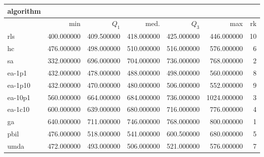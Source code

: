 \begin{tabular}{@{}l*{5}{>{{}}N{4}{0}}>{{}}N{2}{0}@{}}
\toprule
{algorithm} &  \\
\midrule
& {min} & {$Q_1$} & {med.} & {$Q_3$} & {max} & {rk}\\
\midrule
rls & 400.000000 & 409.500000 & 418.000000 & 425.000000 & 446.000000 & 10\\
hc & 476.000000 & 498.000000 & 510.000000 & 516.000000 & 576.000000 & 6\\
sa & 332.000000 & 696.000000 & 704.000000 & 736.000000 & 768.000000 & 2\\
ea-1p1 & 432.000000 & 478.000000 & 488.000000 & 498.000000 & 560.000000 & 8\\
ea-1p10 & 432.000000 & 470.000000 & 480.000000 & 506.000000 & 552.000000 & 9\\
ea-10p1 & 560.000000 & 664.000000 & 684.000000 & 736.000000 & {\color{blue}} 1024.000000 & 3\\
ea-1c10 & 600.000000 & 639.000000 & 680.000000 & 716.000000 & 776.000000 & 4\\
ga & {\color{blue}} 640.000000 & {\color{blue}} 711.000000 & {\color{blue}} 746.000000 & {\color{blue}} 768.000000 & 800.000000 & 1\\
pbil & 476.000000 & 518.000000 & 541.000000 & 600.500000 & 680.000000 & 5\\
umda & 472.000000 & 493.000000 & 506.000000 & 521.000000 & 576.000000 & 7\\
\bottomrule
\end{tabular}
